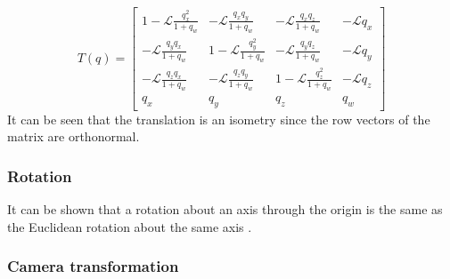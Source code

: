 \begin{equation} \label{eq:translation-matrix}
    T(q) = \begin{bmatrix}
        1 - \mathcal{L}\frac{q_x^2}{1 + q_w} & -\mathcal{L}\frac{q_x q_y}{1 + q_w}  & -\mathcal{L}\frac{q_x q_z}{1 + q_w}  & -\mathcal{L} q_x \\
        -\mathcal{L}\frac{q_y q_x}{1 + q_w}  & 1 - \mathcal{L}\frac{q_y^2}{1 + q_w} & -\mathcal{L}\frac{q_y q_z}{1 + q_w}  & -\mathcal{L} q_y \\
        -\mathcal{L}\frac{q_z q_x}{1 + q_w}  & -\mathcal{L}\frac{q_z q_y}{1 + q_w}  & 1 - \mathcal{L}\frac{q_z^2}{1 + q_w} & -\mathcal{L} q_z \\
        q_x                                  & q_y                                  & q_z                                  & q_w
    \end{bmatrix}
\end{equation}
It can be seen that the translation is an isometry since the row vectors of the matrix are orthonormal.

\subsubsection{Rotation}
It can be shown that a rotation about an axis through the origin is the same as the Euclidean rotation about the same axis \cite{Philips-Mark-Gunn1992}.

\subsubsection{Camera transformation}

